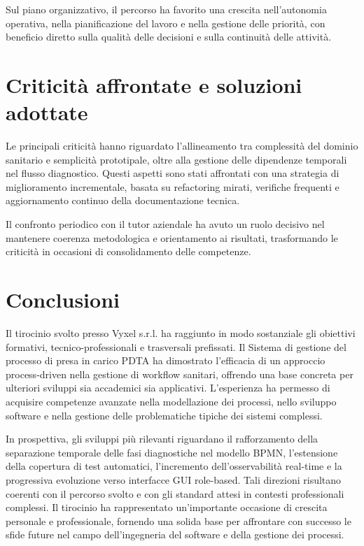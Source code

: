 \documentclass[12pt,a4paper]{article}
\begin{document}
Sul piano organizzativo, il percorso ha favorito una crescita nell'autonomia operativa, nella pianificazione del lavoro e nella gestione delle priorità, con beneficio diretto sulla qualità delle decisioni e sulla continuità delle attività.

\section{Criticità affrontate e soluzioni adottate}

Le principali criticità hanno riguardato l'allineamento tra complessità del dominio sanitario e semplicità prototipale, oltre alla gestione delle dipendenze temporali nel flusso diagnostico. Questi aspetti sono stati affrontati con una strategia di miglioramento incrementale, basata su refactoring mirati, verifiche frequenti e aggiornamento continuo della documentazione tecnica.

Il confronto periodico con il tutor aziendale ha avuto un ruolo decisivo nel mantenere coerenza metodologica e orientamento ai risultati, trasformando le criticità in occasioni di consolidamento delle competenze.

\section*{Conclusioni}

Il tirocinio svolto presso Vyxel s.r.l. ha raggiunto in modo sostanziale gli obiettivi formativi, tecnico-professionali e trasversali prefissati. Il Sistema di gestione del processo di presa in carico PDTA ha dimostrato l’efficacia di un approccio process-driven nella gestione di workflow sanitari, offrendo una base concreta per ulteriori sviluppi sia accademici sia applicativi. L’esperienza ha permesso di acquisire competenze avanzate nella modellazione dei processi, nello sviluppo software e nella gestione delle problematiche tipiche dei sistemi complessi.

In prospettiva, gli sviluppi più rilevanti riguardano il rafforzamento della separazione temporale delle fasi diagnostiche nel modello BPMN, l’estensione della copertura di test automatici, l’incremento dell’osservabilità real-time e la progressiva evoluzione verso interfacce GUI role-based. Tali direzioni risultano coerenti con il percorso svolto e con gli standard attesi in contesti professionali complessi. Il tirocinio ha rappresentato un’importante occasione di crescita personale e professionale, fornendo una solida base per affrontare con successo le sfide future nel campo dell’ingegneria del software e della gestione dei processi.
\end{document}
